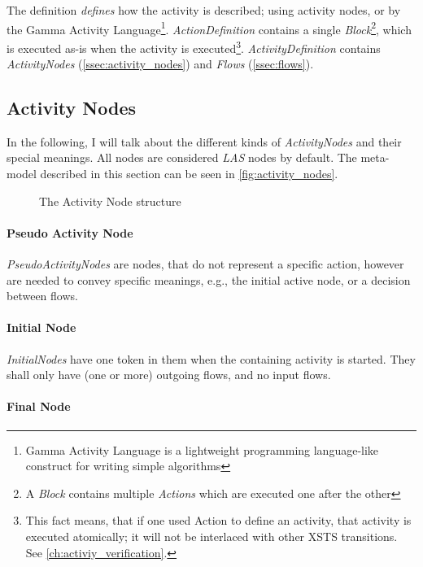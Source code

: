 The definition \emph{defines} how the activity is described; using activity nodes, or by the Gamma Activity Language\footnote{Gamma Activity Language is a lightweight programming language-like construct for writing simple algorithms}. \emph{ActionDefinition} contains a single \emph{Block}\footnote{A \emph{Block} contains multiple \emph{Actions} which are executed one after the other}, which is executed as-is when the activity is executed\footnote{This fact means, that if one used Action to define an activity, that activity is executed atomically; it will not be interlaced with other XSTS transitions. See \autoref{ch:activiy_verification}.}. \emph{ActivityDefinition} contains \emph{ActivityNodes} (\autoref{ssec:activity_nodes}) and \emph{Flows} (\autoref{ssec:flows}).

\subsection{Activity Nodes}\label{ssec:activity_nodes}

In the following, I will talk about the different kinds of \emph{ActivityNodes} and their special meanings. All nodes are considered \emph{LAS} nodes by default. The meta-model described in this section can be seen in \autoref{fig:activity_nodes}.

\begin{figure}[!ht]
	\centering
	
	\caption{The Activity Node structure}
	\label{fig:activity_nodes}
\end{figure}

\paragraph{Pseudo Activity Node}

\emph{PseudoActivityNodes} are nodes, that do not represent a specific action, however are needed to convey specific meanings, e.g., the initial active node, or a decision between flows.

\paragraph{Initial Node}

\emph{InitialNodes} have one token in them when the containing activity is started. They shall only have (one or more) outgoing flows, and no input flows. 

\paragraph{Final Node}

